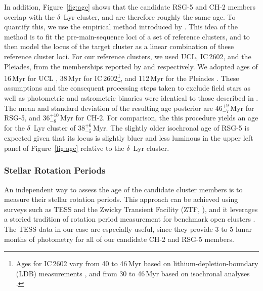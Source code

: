 \documentclass[12pt,twocolumn,linenumbers]{aastex63}
\begin{document}
In addition, Figure~\ref{fig:age} shows that the candidate RSG-5 and
CH-2 members overlap with the $\delta$~Lyr cluster, and are therefore
roughly the same age.  To quantify this, we use the empirical method
introduced by \citet[][see their Section~6.3]{gagne_mutau_2020}.  This
idea of the method is to fit the pre-main-sequence loci of a set of
reference clusters, and to then model the locus of the target cluster
as a linear combination of these reference cluster loci.  For our
reference clusters, we used UCL, IC\,2602, and the Pleiades, from the
memberships reported by \citet{Damiani2019} and
\cite{CantatGaudin2018a} respectively.  We adopted ages of 16\,Myr for
UCL \citep{pecaut_star_2016}, 38\,Myr for IC\,2602\footnote{ Ages for
IC\,2602 vary from 40 to 46\,Myr based on lithium-depletion-boundary
(LDB) measurements \citep{dobbie_ic_2010,randich_gaiaeso_2018}, and
from 30 to 46\,Myr based on isochronal analyses
\citep{stauffer_rotational_1997,david_ages_2015,bossini_age_2019}.},
and 112\,Myr for the Pleiades \citep{dahm_2015}.  These assumptions
and the consequent processing steps taken to exclude field stars as
well as photometric and astrometric binaries were identical to those
described in \citet{bouma_kep1627_2022}.  The mean and standard
deviation of the resulting age posterior are $46^{+9}_{-7}$\,Myr for
RSG-5, and $36^{+10}_{-8}$\,Myr for CH-2.  For comparison, the this
procedure yields an age for the $\delta$~Lyr cluster of
$38^{+6}_{-5}$\,Myr.  The slightly older isochronal age of RSG-5 is
expected given that its locus is slightly bluer and less luminous in
the upper left panel of Figure~\ref{fig:age} relative to the
$\delta$~Lyr cluster.


\subsubsection{Stellar Rotation Periods}
\label{sec:rotation}

An independent way to assess the age of the candidate cluster members
is to measure their stellar rotation periods.  This approach can be
achieved using surveys such as TESS \citep{ricker_transiting_2015} and
the Zwicky Transient Facility (ZTF, \citealt{bellm_zwicky_2019}), and
it leverages a storied tradition of rotation period measurement for
benchmark open clusters \citep[see {\it
e.g.},][]{skumanich_time_1972,curtis_rup147_2020}.  The TESS data in
our case are especially useful, since they provide 3 to 5 lunar months
of photometry for all of our candidate CH-2 and RSG-5 members.
\end{document}
